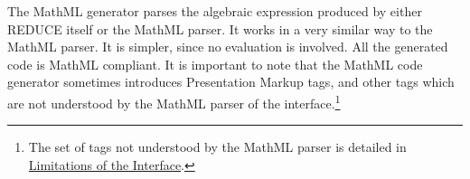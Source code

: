 The MathML generator parses the algebraic expression produced by
either REDUCE itself or the MathML parser.  It works in a very similar
way to the MathML parser.  It is simpler, since no evaluation is
involved.  All the generated code is MathML compliant.  It is
important to note that the MathML code generator sometimes introduces
Presentation Markup tags, and other tags which are not understood by
the MathML parser of the interface.\footnote{The set of tags not
understood by the MathML parser is detailed in
\hyperref[mathml:limitations]{Limitations of the Interface}.}
